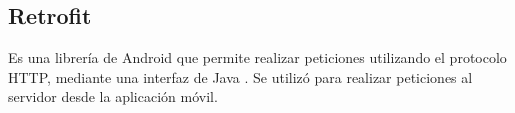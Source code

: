 \subsection{Retrofit}
Es una librería de Android que permite realizar peticiones utilizando el protocolo HTTP, mediante una interfaz de Java \cite{RFT1}. Se utilizó para realizar peticiones al servidor desde la aplicación móvil.

